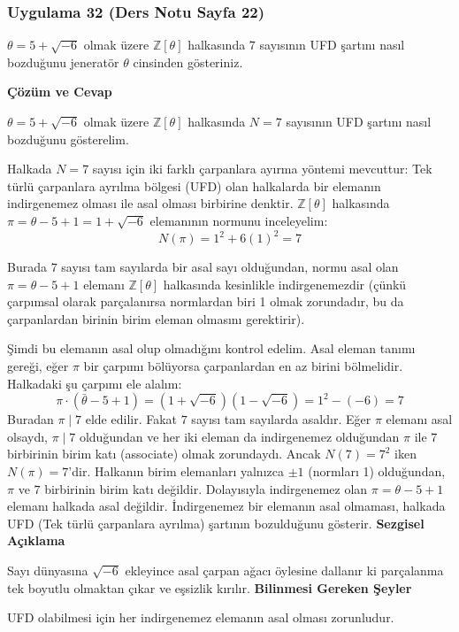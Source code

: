 \documentclass[11pt, a4paper]{article}
\newenvironment{cozum}{
    \vspace{0.5cm}
    \noindent\textcolor{green!60!black}{\faCheckCircle\enspace \textbf{\Large Çözüm ve Cevap}}\par\vspace{0.2cm}
}{}
\newenvironment{sezgisel}{
    \vspace{0.5cm}
    \noindent\textcolor{orange!80!black}{\faLightbulb\enspace \textbf{\Large Sezgisel Açıklama}}\par\vspace{0.2cm}
    \itshape
}{}
\newenvironment{bilgi}{
    \vspace{0.5cm}
    \noindent\textcolor{red!70!black}{\faExclamationTriangle\enspace \textbf{\Large Bilinmesi Gereken Şeyler}}\par\vspace{0.2cm}
}{}
\begin{document}
\subsubsection{Uygulama 32 (Ders Notu Sayfa 22)}
\begin{sorubox}
$\theta = 5 + \sqrt{-6}$ olmak üzere $\mathbb{Z}[\theta]$ halkasında $7$ sayısının UFD şartını nasıl bozduğunu jeneratör $\theta$ cinsinden gösteriniz.
\end{sorubox}
\begin{cozum}
$\theta = 5 + \sqrt{-6}$ olmak üzere $\mathbb{Z}[\theta]$ halkasında $N = 7$ sayısının UFD şartını nasıl bozduğunu gösterelim.

Halkada $N = 7$ sayısı için iki farklı çarpanlara ayırma yöntemi mevcuttur:
Tek türlü çarpanlara ayrılma bölgesi (UFD) olan halkalarda bir elemanın indirgenemez olması ile asal olması birbirine denktir. $\mathbb{Z}[\theta]$ halkasında $\pi = \theta - 5 + 1 = 1+\sqrt{-6}$ elemanının normunu inceleyelim:
\[ N(\pi) = 1^2 + 6(1)^2 = 7 \]

Burada $7$ sayısı tam sayılarda bir asal sayı olduğundan, normu asal olan $\pi = \theta - 5 + 1$ elemanı $\mathbb{Z}[\theta]$ halkasında kesinlikle indirgenemezdir (çünkü çarpımsal olarak parçalanırsa normlardan biri 1 olmak zorundadır, bu da çarpanlardan birinin birim eleman olmasını gerektirir).

Şimdi bu elemanın asal olup olmadığını kontrol edelim. Asal eleman tanımı gereği, eğer $\pi$ bir çarpımı bölüyorsa çarpanlardan en az birini bölmelidir. Halkadaki şu çarpımı ele alalım:
\[ \pi \cdot (\bar{\theta} - 5 + 1) = (1+\sqrt{-6})(1-\sqrt{-6}) = 1^2 - (-6) = 7 \]
Buradan $\pi \mid 7$ elde edilir. Fakat $7$ sayısı tam sayılarda asaldır. Eğer $\pi$ elemanı asal olsaydı, $\pi \mid 7$ olduğundan ve her iki eleman da indirgenemez olduğundan $\pi$ ile $7$ birbirinin birim katı (associate) olmak zorundaydı. Ancak $N(7) = 7^2$ iken $N(\pi) = 7$'dir. Halkanın birim elemanları yalnızca $\pm 1$ (normları 1) olduğundan, $\pi$ ve $7$ birbirinin birim katı değildir. Dolayısıyla indirgenemez olan $\pi = \theta - 5 + 1$ elemanı halkada asal değildir. İndirgenemez bir elemanın asal olmaması, halkada UFD (Tek türlü çarpanlara ayrılma) şartının bozulduğunu gösterir.
\end{cozum}
\begin{sezgisel}
Sayı dünyasına $\sqrt{-6}$ ekleyince asal çarpan ağacı öylesine dallanır ki parçalanma tek boyutlu olmaktan çıkar ve eşsizlik kırılır.
\end{sezgisel}
\begin{bilgi}
UFD olabilmesi için her indirgenemez elemanın asal olması zorunludur.
\end{bilgi}
\end{document}
